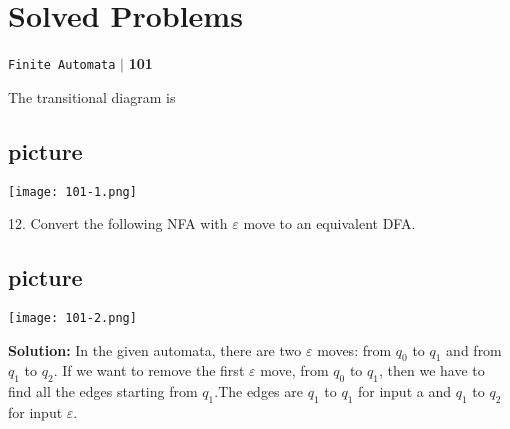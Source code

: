 \documentclass[8pt]{beamer}
\begin{document}
\begin{frame}
 \section*{Solved Problems}
\begin{flushright}
 \texttt{Finite Automata} \hspace*{0.1cm}\textbf{$|$} \hspace*{0.1cm} \textbf{101}\hspace*{0.1cm}
\end{flushright}
\vspace*{1.5cm}

\hspace*{0.5cm} The transitional diagram is\\

\vspace*{0.7cm}
\begin{center}
\section{picture}
\texttt{[image: 101-1.png]}
\end{center}

\end{frame}

\begin{frame}
12. Convert the following NFA with $\varepsilon$ move to an equivalent DFA.\\

\vspace*{0.3cm}
\begin{center}
\section{picture}
\texttt{[image: 101-2.png]}
\end{center}

\vspace*{0.3cm}
\textbf{Solution:} In the given automata, there are two $\varepsilon$ moves: from $q_0$ to $q_1$ and from $q_1$ to $q_2$. If we want
to remove the first $\varepsilon$ move, from $q_0$ to $q_1$, then we have to find all the edges starting from $q_1$.The
edges are $q_1$ to $q_1$ for input a and $q_1$ to $q_2$ for input $\varepsilon$.\\
\end{frame}
\end{document}

